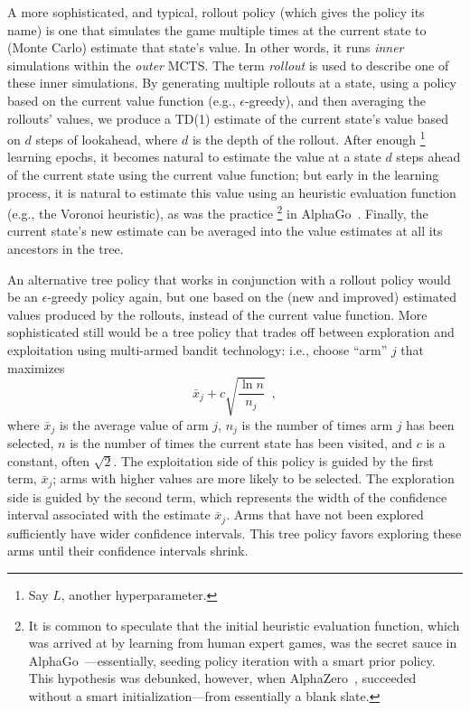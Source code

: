 \documentclass{article}
\begin{document}

A more sophisticated, and typical, rollout policy (which gives the
policy its name) is one that simulates the game multiple times at the
current state to (Monte Carlo) estimate that state's value.  In other
words, it runs \emph{inner\/} simulations within the \emph{outer}
MCTS.  The term \emph{rollout\/} is used to describe one of these
inner simulations.  By generating multiple rollouts at a state, using
a policy based on the current value function (e.g.,
$\epsilon$-greedy), and then averaging the rollouts' values, we
produce a TD(1) estimate of the current state's value based on $d$
steps of lookahead, where $d$ is the depth of the rollout.
%
After enough%
\footnote{Say $L$, another hyperparameter.}
learning epochs, it becomes natural to estimate the value at a state
$d$ steps ahead of the current state using the current value function;
but early in the learning process, it is natural to estimate this
value using an heuristic evaluation function (e.g., the Voronoi
heuristic), as was the practice%
\footnote{It is common to speculate that the initial heuristic
  evaluation function, which was arrived at by learning from human
  expert games, was the secret sauce in
  AlphaGo~\cite{silver16}---essentially, seeding policy iteration with
  a smart prior policy.  This hypothesis was debunked, however, when
  AlphaZero~\cite{silver18}, succeeded without a smart
  initialization---from essentially a blank slate.}
in AlphaGo~\cite{silver16}.
%
Finally, the current state's new estimate can be averaged into the value
estimates at all its ancestors in the tree.

An alternative tree policy that works in conjunction with a rollout policy
would be an $\epsilon$-greedy policy again, but one based on the (new
and improved) estimated values produced by the rollouts, instead of
the current value function.  More sophisticated still would be a tree
policy that trades off between exploration and exploitation using
multi-armed bandit technology: i.e., choose ``arm'' $j$ that maximizes
\[
\bar{x}_j + c \sqrt{\frac{\ln n}{n_j}} \enspace ,
\]
where $\bar{x}_j$ is the average value of arm $j$, $n_j$ is the number
of times arm $j$ has been selected, $n$ is the number of times the
current state has been visited, and $c$ is a constant, often
$\sqrt{2}$.  The exploitation side of this policy is guided by the
first term, $\bar{x}_j$; arms with higher values are more likely to be
selected.  The exploration side is guided by the second term, which
represents the width of the confidence interval associated with the
estimate $\bar{x}_j$.  Arms that have not been explored sufficiently
have wider confidence intervals.  This tree policy favors exploring
these arms until their confidence intervals shrink.
\end{document}

